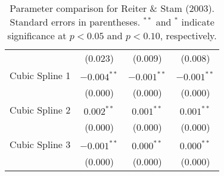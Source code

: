 \begin{table}[ht]
\begin{tabular}{lccc}
   & (0.023) & (0.009) & (0.008) \\ 
  Cubic Spline 1 & $-0.004^{\ast\ast}$ & $-0.001^{\ast\ast}$ & $-0.001^{\ast\ast}$ \\ 
   & (0.000) & (0.000) & (0.000) \\ 
  Cubic Spline 2 & $0.002^{\ast\ast}$ & $0.001^{\ast\ast}$ & $0.001^{\ast\ast}$ \\ 
   & (0.000) & (0.000) & (0.000) \\ 
  Cubic Spline 3 & $-0.001^{\ast\ast}$ & $0.000^{\ast\ast}$ & $0.000^{\ast\ast}$ \\ 
   & (0.000) & (0.000) & (0.000) \\ 
   \hline
\hline
\end{tabular}
\endgroup
\caption{Parameter comparison for Reiter \& Stam (2003). Standard errors in parentheses. $^{**}$ and $^{*}$ indicate significance at $p<0.05$ and $p<0.10$, respectively.} 
\label{tab:reiter_stam_coef}
\end{table}
